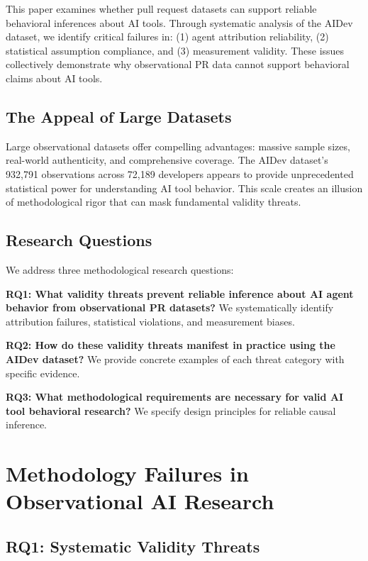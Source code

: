 \documentclass[conference]{IEEEtran}
\begin{document}
This paper examines whether pull request datasets can support reliable behavioral inferences about AI tools. Through systematic analysis of the AIDev dataset, we identify critical failures in: (1) agent attribution reliability, (2) statistical assumption compliance, and (3) measurement validity. These issues collectively demonstrate why observational PR data cannot support behavioral claims about AI tools.

\subsection{The Appeal of Large Datasets}

Large observational datasets offer compelling advantages: massive sample sizes, real-world authenticity, and comprehensive coverage. The AIDev dataset's 932,791 observations across 72,189 developers appears to provide unprecedented statistical power for understanding AI tool behavior. This scale creates an illusion of methodological rigor that can mask fundamental validity threats.

\subsection{Research Questions}

We address three methodological research questions:

\textbf{RQ1: What validity threats prevent reliable inference about AI agent behavior from observational PR datasets?} We systematically identify attribution failures, statistical violations, and measurement biases.

\textbf{RQ2: How do these validity threats manifest in practice using the AIDev dataset?} We provide concrete examples of each threat category with specific evidence.

\textbf{RQ3: What methodological requirements are necessary for valid AI tool behavioral research?} We specify design principles for reliable causal inference.

\section{Methodology Failures in Observational AI Research}

\subsection{RQ1: Systematic Validity Threats}
\end{document}
